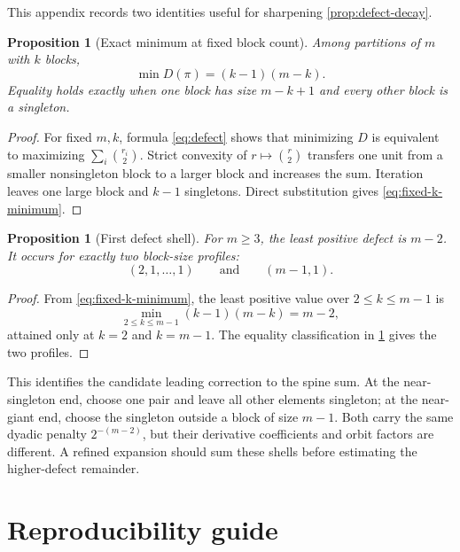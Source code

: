 \documentclass[11pt,oneside]{article}
\newtheorem{proposition}[theorem]{Proposition}
\theoremstyle{definition}
\theoremstyle{remark}
\begin{document}
This appendix records two identities useful for sharpening
\cref{prop:defect-decay}.

\begin{proposition}[Exact minimum at fixed block count]
\label{prop:fixed-k-minimum}
Among partitions of $m$ with $k$ blocks,
\begin{equation}
 \min D(\pi)=(k-1)(m-k).
 \label{eq:fixed-k-minimum}
\end{equation}
Equality holds exactly when one block has size $m-k+1$ and every other block is a
singleton.
\end{proposition}

\begin{proof}
For fixed $m,k$, formula \eqref{eq:defect} shows that minimizing $D$ is equivalent to
maximizing $\sum_i\binom{r_i}{2}$.  Strict convexity of $r\mapsto\binom r2$ transfers
one unit from a smaller nonsingleton block to a larger block and increases the sum.
Iteration leaves one large block and $k-1$ singletons.  Direct substitution gives
\eqref{eq:fixed-k-minimum}.
\end{proof}

\begin{proposition}[First defect shell]
\label{prop:first-shell}
For $m\geq3$, the least positive defect is $m-2$.  It occurs for exactly two block-size
profiles:
\begin{equation}
 (2,1,\ldots,1)
 \qquad\text{and}\qquad
 (m-1,1).
 \label{eq:first-shell}
\end{equation}
\end{proposition}

\begin{proof}
From \eqref{eq:fixed-k-minimum}, the least positive value over $2\leq k\leq m-1$ is
\[
 \min_{2\leq k\leq m-1}(k-1)(m-k)=m-2,
\]
attained only at $k=2$ and $k=m-1$.  The equality classification in
\cref{prop:fixed-k-minimum} gives the two profiles.
\end{proof}

This identifies the candidate leading correction to the spine sum.  At the
near-singleton end, choose one pair and leave all other elements singleton; at the
near-giant end, choose the singleton outside a block of size $m-1$.  Both carry the
same dyadic penalty $2^{-(m-2)}$, but their derivative coefficients and orbit factors
are different.  A refined expansion should sum these shells before estimating the
higher-defect remainder.

\section{Reproducibility guide}
\label{app:reproducibility}
\end{document}
